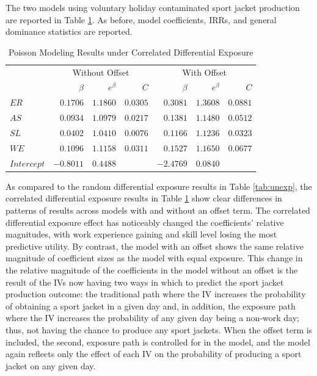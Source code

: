 \documentclass[ShortAfour,times,sageapa]{sagej}
\begin{document}
	The two models using voluntary holiday contaminated sport jacket production are reported in Table \ref{tab:exp}.
	As before, model coefficients, IRRs, and general dominance statistics are reported.
	
	\begin{table}[h!]
		\centering
		\caption{\centering Poisson Modeling Results under Correlated Differential Exposure}
		\begin{tabular}{l|rrrrrr}
			\toprule
			\multicolumn{1}{l}{} & \multicolumn{3}{c}{Without Offset} & \multicolumn{3}{c}{With Offset} \\ 
			\cmidrule(lr){2-4} \cmidrule(lr){5-7}
			\multicolumn{1}{l}{} & $\beta$ & $e^{\beta}$ & $C$ & $\beta$ & $e^{\beta}$ & $C$ \\ 
			\midrule
			$ER$ & $0.1706$ & $1.1860$ & $0.0305$ & $0.3081$ & $1.3608$ & $0.0881$ \\ 
			$AS$ & $0.0934$ & $1.0979$ & $0.0217$ & $0.1381$ & $1.1480$ & $0.0512$ \\
			$SL$ & $0.0402$ & $1.0410$ & $0.0076$ & $0.1166$ & $1.1236$ & $0.0323$ \\ 
			$WE$ & $0.1096$ & $1.1158$ & $0.0311$ & $0.1527$ & $1.1650$ & $0.0677$ \\
			$Intercept$ & $-0.8011$ & $0.4488$ & & $-2.4769$ & $0.0840$ & \\
			\bottomrule
		\end{tabular}
		\label{tab:exp}
	\end{table}
	
	As compared to the random differential exposure results in Table \ref{tab:unexp}, the correlated differential exposure results in Table \ref{tab:exp} show clear differences in patterns of results across models with and without an offset term.
	The correlated differential exposure effect has noticeably changed the coefficients' relative magnitudes, with work experience gaining and skill level losing the most predictive utility.
	By contrast, the model with an offset shows the same relative magnitude of coefficient sizes as the model with equal exposure.
	This change in the relative magnitude of the coefficients in the model without an offset is the result of the IVs now having two ways in which to predict the sport jacket production outcome: the traditional path where the IV increases the probability of obtaining a sport jacket in a given day and, in addition, the exposure path where the IV increases the probability of any given day being a non-work day; thus, not having the chance to produce any sport jackets.
	When the offset term is included, the second, exposure path is controlled for in the model, and the model again reflects only the effect of each IV on the probability of producing a sport jacket on any given day.
	
\end{document}
